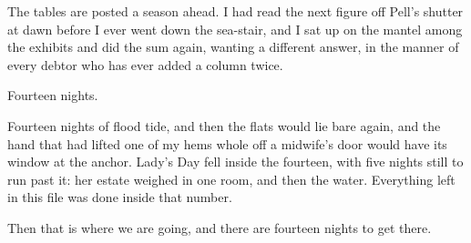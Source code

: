 The tables are posted a season ahead. I had read the next figure off Pell's shutter at dawn before I ever went down the sea-stair, and I sat up on the mantel among the exhibits and did the sum again, wanting a different answer, in the manner of every debtor who has ever added a column twice.

Fourteen nights.

Fourteen nights of flood tide, and then the flats would lie bare again, and the hand that had lifted one of my hems whole off a midwife's door would have its window at the anchor. Lady's Day fell inside the fourteen, with five nights still to run past it: her estate weighed in one room, and then the water. Everything left in this file was done inside that number.

Then that is where we are going, and there are fourteen nights to get there.

